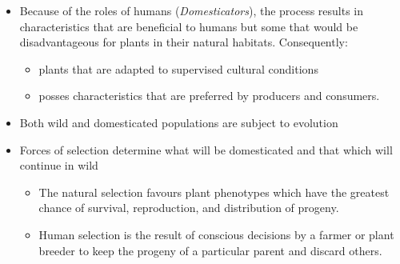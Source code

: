 \documentclass[11pt,ignorenonframetext,aspectratio=169]{beamer}
\providecommand{\tightlist}{%
  \setlength{\itemsep}{0pt}\setlength{\parskip}{0pt}}
\begin{document}
\begin{frame}{}
\protect\hypertarget{section}{}
\begin{itemize}
\tightlist
\item
  Because of the roles of humans (\emph{Domesticators}), the process
  results in characteristics that are beneficial to humans but some that
  would be disadvantageous for plants in their natural habitats.
  Consequently:

  \begin{itemize}
  \tightlist
  \item
    plants that are adapted to supervised cultural conditions
  \item
    posses characteristics that are preferred by producers and
    consumers.
  \end{itemize}
\item
  Both wild and domesticated populations are subject to evolution
\item
  Forces of selection determine what will be domesticated and that which
  will continue in wild

  \begin{itemize}
  \tightlist
  \item
    The natural selection favours plant phenotypes which have the
    greatest chance of survival, reproduction, and distribution of
    progeny.
  \item
    Human selection is the result of conscious decisions by a farmer or
    plant breeder to keep the progeny of a particular parent and discard
    others.
  \end{itemize}
\end{itemize}
\end{frame}
\end{document}
